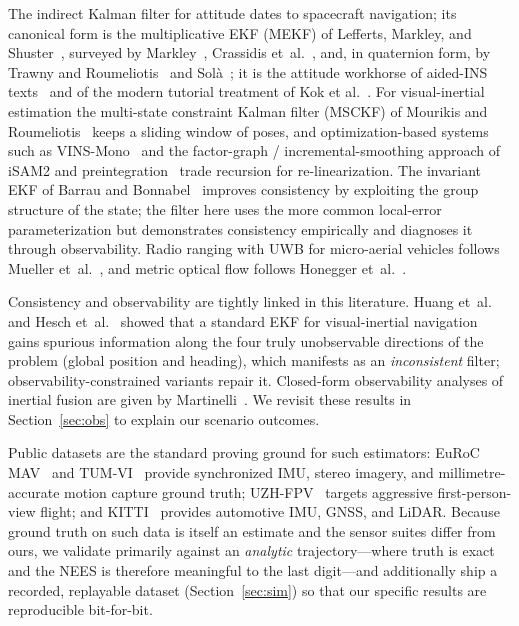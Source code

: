 \documentclass[11pt]{article}
\begin{document}
The indirect Kalman filter for attitude dates to spacecraft navigation; its canonical form is the
multiplicative EKF (MEKF) of Lefferts, Markley, and Shuster~\cite{lefferts1982}, surveyed by
Markley~\cite{markley2003}, Crassidis et~al.~\cite{crassidis2007}, and, in quaternion form, by Trawny
and Roumeliotis~\cite{trawny2005} and Sol\`a~\cite{sola2017}; it is the attitude workhorse of aided-INS
texts~\cite{farrell2008,groves2013,titterton2004} and of the modern tutorial treatment of Kok et
al.~\cite{kok2017}. For visual-inertial estimation the multi-state constraint Kalman filter (MSCKF) of
Mourikis and Roumeliotis~\cite{mourikis2007} keeps a sliding window of poses, and optimization-based
systems such as VINS-Mono~\cite{qin2018} and the factor-graph / incremental-smoothing approach of
iSAM2 and preintegration~\cite{kaess2012,forster2017} trade recursion for re-linearization. The
invariant EKF of Barrau and Bonnabel~\cite{barrau2017} improves consistency by exploiting the group
structure of the state; the filter here uses the more common local-error parameterization but
demonstrates consistency empirically and diagnoses it through observability. Radio ranging with UWB for
micro-aerial vehicles follows Mueller et~al.~\cite{mueller2015}, and metric optical flow follows
Honegger et~al.~\cite{honegger2013}.

Consistency and observability are tightly linked in this literature. Huang et~al.~\cite{huang2010} and
Hesch et~al.~\cite{hesch2014} showed that a standard EKF for visual-inertial navigation gains spurious
information along the four truly unobservable directions of the problem (global position and heading),
which manifests as an \emph{inconsistent} filter; observability-constrained variants repair it. Closed-form
observability analyses of inertial fusion are given by Martinelli~\cite{martinelli2012}. We revisit these
results in Section~\ref{sec:obs} to explain our scenario outcomes.

Public datasets are the standard proving ground for such estimators: EuRoC MAV~\cite{burri2016} and
TUM-VI~\cite{schubert2018} provide synchronized IMU, stereo imagery, and millimetre-accurate motion
capture ground truth; UZH-FPV~\cite{delmerico2019} targets aggressive first-person-view flight; and
KITTI~\cite{geiger2013} provides automotive IMU, GNSS, and LiDAR. Because ground truth on such data is
itself an estimate and the sensor suites differ from ours, we validate primarily against an
\emph{analytic} trajectory---where truth is exact and the NEES is therefore meaningful to the last
digit---and additionally ship a recorded, replayable dataset (Section~\ref{sec:sim}) so that our
specific results are reproducible bit-for-bit.
\end{document}
